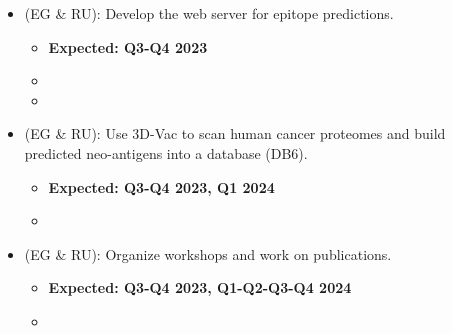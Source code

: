 \begin{enumerate}[start=0,leftmargin=.7in,label={\bfseries \ding{118} Task \arabic*:}]
\begin{itemize}
        \item (EG \& RU): Develop the web server for epitope predictions.
        \begin{itemize}
            \item \textbf{Expected: Q3-Q4 2023}
            \item {}
            \item {}
        \end{itemize}
        \item (EG \& RU): Use 3D-Vac to scan human cancer proteomes and build predicted neo-antigens into a database (DB6).
        \begin{itemize}
            \item \textbf{Expected: Q3-Q4 2023, Q1 2024}
            \item {}
        \end{itemize}
        \item (EG \& RU): Organize workshops and work on publications.
        \begin{itemize}
            \item \textbf{Expected: Q3-Q4 2023, Q1-Q2-Q3-Q4 2024}
            \item {}
        \end{itemize}
    \end{itemize}
\end{enumerate}
%
